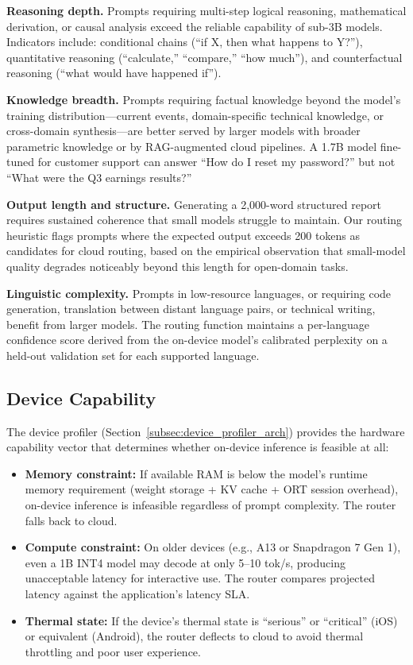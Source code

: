 \documentclass[12pt, letterpaper, twoside]{report}
\begin{document}
\textbf{Reasoning depth.} Prompts requiring multi-step logical reasoning, mathematical derivation, or causal analysis exceed the reliable capability of sub-3B models. Indicators include: conditional chains (``if X, then what happens to Y?''), quantitative reasoning (``calculate,'' ``compare,'' ``how much''), and counterfactual reasoning (``what would have happened if'').

\textbf{Knowledge breadth.} Prompts requiring factual knowledge beyond the model's training distribution---current events, domain-specific technical knowledge, or cross-domain synthesis---are better served by larger models with broader parametric knowledge or by RAG-augmented cloud pipelines. A 1.7B model fine-tuned for customer support can answer ``How do I reset my password?'' but not ``What were the Q3 earnings results?''

\textbf{Output length and structure.} Generating a 2,000-word structured report requires sustained coherence that small models struggle to maintain. Our routing heuristic flags prompts where the expected output exceeds 200 tokens as candidates for cloud routing, based on the empirical observation that small-model quality degrades noticeably beyond this length for open-domain tasks.

\textbf{Linguistic complexity.} Prompts in low-resource languages, or requiring code generation, translation between distant language pairs, or technical writing, benefit from larger models. The routing function maintains a per-language confidence score derived from the on-device model's calibrated perplexity on a held-out validation set for each supported language.

\subsection{Device Capability}
\label{subsec:device_capability}

The device profiler (Section~\ref{subsec:device_profiler_arch}) provides the hardware capability vector that determines whether on-device inference is feasible at all:

\begin{itemize}[itemsep=1pt, topsep=2pt, parsep=0pt]
\item \textbf{Memory constraint:} If available RAM is below the model's runtime memory requirement (weight storage + KV cache + ORT session overhead), on-device inference is infeasible regardless of prompt complexity. The router falls back to cloud.
\item \textbf{Compute constraint:} On older devices (e.g., A13 or Snapdragon 7 Gen 1), even a 1B INT4 model may decode at only 5--10 tok/s, producing unacceptable latency for interactive use. The router compares projected latency against the application's latency SLA.
\item \textbf{Thermal state:} If the device's thermal state is ``serious'' or ``critical'' (iOS) or equivalent (Android), the router deflects to cloud to avoid thermal throttling and poor user experience.
\end{itemize}
\end{document}
